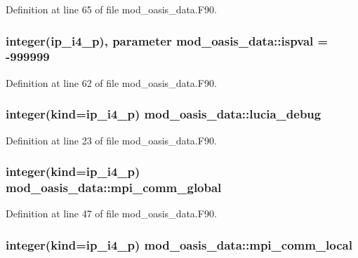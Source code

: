 Definition at line 65 of file mod\+\_\+oasis\+\_\+data.\+F90.

\hypertarget{classmod__oasis__data_a66bd35eca1454b6d8c8ac0449f2ca475}{
\subsubsection[{ispval}]{\setlength{\rightskip}{0pt plus 5cm}integer(ip\+\_\+i4\+\_\+p), parameter mod\+\_\+oasis\+\_\+data\+::ispval = -\/999999}}\label{classmod__oasis__data_a66bd35eca1454b6d8c8ac0449f2ca475}


Definition at line 62 of file mod\+\_\+oasis\+\_\+data.\+F90.

\hypertarget{classmod__oasis__data_a7c427f27ff231565a1ecc0caeb30c67c}{
\subsubsection[{lucia\+\_\+debug}]{\setlength{\rightskip}{0pt plus 5cm}integer(kind=ip\+\_\+i4\+\_\+p) mod\+\_\+oasis\+\_\+data\+::lucia\+\_\+debug}}\label{classmod__oasis__data_a7c427f27ff231565a1ecc0caeb30c67c}


Definition at line 23 of file mod\+\_\+oasis\+\_\+data.\+F90.

\hypertarget{classmod__oasis__data_a4bbff51054fd1746849de9defb3d5252}{
\subsubsection[{mpi\+\_\+comm\+\_\+global}]{\setlength{\rightskip}{0pt plus 5cm}integer(kind=ip\+\_\+i4\+\_\+p) mod\+\_\+oasis\+\_\+data\+::mpi\+\_\+comm\+\_\+global}}\label{classmod__oasis__data_a4bbff51054fd1746849de9defb3d5252}


Definition at line 47 of file mod\+\_\+oasis\+\_\+data.\+F90.

\hypertarget{classmod__oasis__data_acd8801d4fab87a19c6f4f69a661d56c5}{
\subsubsection[{mpi\+\_\+comm\+\_\+local}]{\setlength{\rightskip}{0pt plus 5cm}integer(kind=ip\+\_\+i4\+\_\+p) mod\+\_\+oasis\+\_\+data\+::mpi\+\_\+comm\+\_\+local}}\label{classmod__oasis__data_acd8801d4fab87a19c6f4f69a661d56c5}


